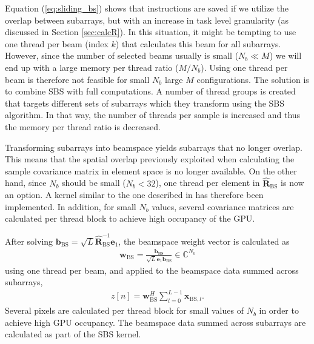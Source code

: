 \documentclass[journal]{IEEEtran}
\newcommand{\mat}[1]{\mathbf{#1}}
\renewcommand{\vec}[1]{\mathbf{#1}}
\begin{document}
Equation (\ref{eq:sliding_bs}) shows that instructions are saved if we utilize the overlap between subarrays, but with an increase in task level granularity (as discussed in Section \ref{sec:calcR}). In this situation, it might be tempting to use one thread per beam (index $k$) that calculates this beam for all subarrays. However, since the number of selected beams usually is small ($N_b \ll M$) we will end up with a large memory per thread ratio ($M/N_b$). Using one thread per beam is therefore not feasible for small $N_b$ large $M$ configurations. The solution is to combine SBS with full computations. A number of thread groups is created that targets different sets of subarrays which they transform using the SBS algorithm. In that way, the number of threads per sample is increased and thus the memory per thread ratio is decreased. 

Transforming subarrays into beamspace yields subarrays that no longer overlap. This means that the spatial overlap previously exploited when calculating the sample covariance matrix in element space is no longer available. On the other hand, since $N_b$ should be small ($N_b < 32$), one thread per element in $\mat{\hat{R}}_\text{BS}$ is now an option. A kernel similar to the one described in \cite{Chen2011} has therefore been implemented. In addition, for small $N_b$ values, several covariance matrices are calculated per thread block to achieve high occupancy of the GPU.

After solving $\vec{b}_\text{BS} = \sqrt{L}\mat{\hat{R}}_\text{BS}^{-1}\vec{e}_1$, the beamspace weight vector is calculated as 
\begin{align}
\vec{w}_\text{BS} = \frac{\vec{b}_\text{BS}}{\sqrt{L}\vec{e}_1\vec{b}_\text{BS}} \in \mathbb{C}^{N_b}
\end{align}  
using one thread per beam, and applied to the beamspace data summed across subarrays,
\begin{align}
z[n] = \vec{w}_\text{BS}^H\sum_{l=0}^{L-1}\vec{x}_{\text{BS},l}. 
\end{align}
Several pixels are calculated per thread block for small values of $N_b$ in order to achieve high GPU occupancy. The beamspace data summed across subarrays are calculated as part of the SBS kernel.   

\end{document}
